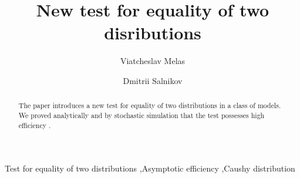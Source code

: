 \documentclass[final,11pt,3p]{elsarticle}
\begin{document}
\begin{frontmatter}


\title{New test for equality of two disributions}





\author[label1]{Viatcheslav Melas}
\author[label1]{Dmitrii Salnikov}
\address[label1]{St. Petersburg State University \\
\small Department of Mathematics \\
\small St. Petersburg ,  Russia \\}
\begin{abstract}
The paper introduces a new test for equality of two distributions in a class of models.  We proved analytically and by stochastic simulation that the test possesses high efficiency .
\end{abstract}

\begin{keyword}
Test for equality of two distributions \sep Asymptotic efficiency \sep Caushy distribution


\end{keyword}

\end{frontmatter}
\pagestyle{empty}
\end{document}
